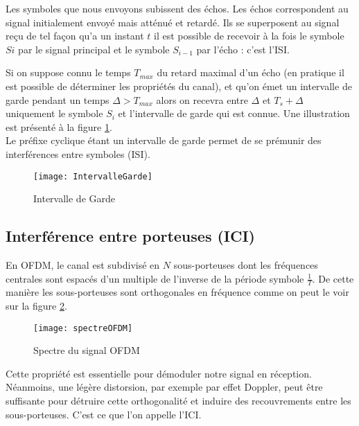 Les symboles que nous envoyons subissent des échos. Les échos correspondent au
signal initialement envoyé mais atténué et retardé. Ils se superposent au signal
reçu de tel façon qu'a un instant $t$ il est possible de recevoir à la fois le symbole $Si$ par le
signal principal et le symbole $S_{i-1}$ par l'écho : c'est l'ISI.

Si on suppose connu le temps $T_{max}$ du retard maximal d'un écho (en pratique
il est possible de déterminer les propriétés du canal), et qu'on émet un
intervalle de garde pendant un temps $\Delta > T_{max}$ alors on recevra entre
$\Delta$ et $T_s+\Delta$ uniquement le symbole $S_i$ et l'intervalle de garde
qui est connue. Une illustration est présenté à la figure
\ref{fig:intervalleGarde}.
~\\

Le préfixe cyclique étant un intervalle de garde permet de se prémunir des
interférences entre symboles (ISI).



\begin{figure}[!h]
  \centering
  \texttt{[image: IntervalleGarde]}
  \caption{Intervalle de Garde}
  \label{fig:intervalleGarde}
\end{figure}

\subsection{Interférence entre porteuses (ICI)}
\label{sec:ICI}


En OFDM, le canal est subdivisé en $N$ sous-porteuses dont les fréquences centrales
sont espacés d'un multiple de l'inverse de la période symbole $\frac{1}{T}$. De
cette manière les sous-porteuses sont orthogonales en fréquence comme on peut le
voir sur la figure \ref{fig:spectre}.

\begin{figure}[!h]
  \centering
  \texttt{[image: spectreOFDM]}
  \caption{Spectre du signal OFDM \cite{annick}}
  \label{fig:spectre}
\end{figure}

Cette propriété est essentielle pour démoduler notre signal en réception.
Néanmoins, une légère distorsion, par exemple par effet Doppler, peut être
suffisante pour détruire cette orthogonalité et induire des recouvrements entre
les sous-porteuses. C'est ce que l'on appelle l'ICI.


